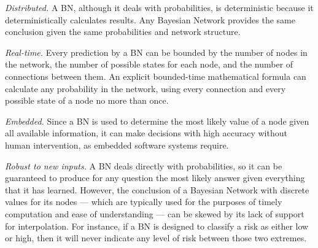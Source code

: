 \documentclass[conference]{IEEEtran}
\begin{document}
	\emph{Distributed.} A BN, although it deals with probabilities, is deterministic because it deterministically calculates results. Any Bayesian Network provides the same conclusion given the same probabilities and network structure.
	
	\emph{Real-time.} Every prediction by a BN
can be bounded by the number of nodes in the network, the number of possible states for each node, and the number of connections between them.
An explicit bounded-time mathematical formula can calculate any probability in the network, using every connection and every possible state of a node no more than once.
	
	\emph{Embedded.} Since a BN is used to determine the most likely value of a node given all available information, it can make decisions with high accuracy without human intervention, as embedded software systems require.
	
	\emph{Robust to new inputs.} A BN deals directly with probabilities, so it can be guaranteed to produce for any question the most likely answer given everything that it has learned. However, the conclusion of a Bayesian Network with discrete values for its nodes --- which are typically used for the purposes of timely computation and ease of understanding
--- can be skewed by its lack of support for interpolation.
For instance, if a BN is designed to classify a risk as either low or high, then it will never indicate any level of risk between those two extremes.
	
\end{document}
